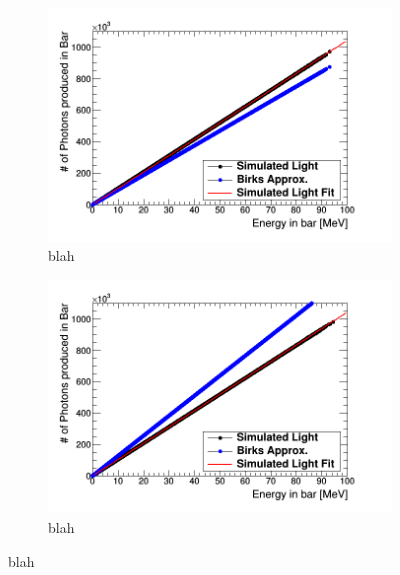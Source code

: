 \documentclass[12pt,a4paper]{article}
\begin{document}
\begin{figure}[H]
\centering
\begin{subfigure}{.5\textwidth}
  \centering
  \includegraphics[width=\linewidth]{light_of_electrons0-100mev.png}
  \captionsetup{width=.9\linewidth}
  \caption{blah}
  \label{a}
\end{subfigure}%
\begin{subfigure}{.5\textwidth}
  \centering
  \includegraphics[width=\linewidth]{light_of_positrons0-100mev.png}
  \captionsetup{width=.9\linewidth}
  \caption{blah}
  \label{b}
\end{subfigure}
\caption{blah}
\label{c}
\end{figure}
\end{document}
